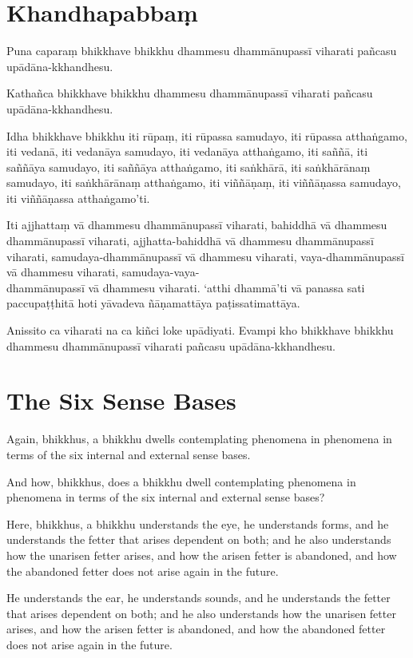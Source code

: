 \paliPage
\section*{Khandhapabbaṃ}

Puna caparaṃ bhikkhave bhikkhu dhammesu dhammānupassī viharati pañcasu
upādāna-kkhandhesu.

Kathañca bhikkhave bhikkhu dhammesu dhammānupassī viharati pañcasu
upādāna-kkhandhesu.

Idha bhikkhave bhikkhu
iti rūpaṃ, iti rūpassa samudayo, iti rūpassa atthaṅgamo,
iti vedanā, iti vedanāya samudayo, iti vedanāya atthaṅgamo,
iti saññā, iti saññāya samudayo, iti saññāya atthaṅgamo,
iti saṅkhārā, iti saṅkhārānaṃ samudayo, iti saṅkhārānaṃ atthaṅgamo,
iti viññāṇaṃ, iti viññāṇassa samudayo, iti viññāṇassa atthaṅgamo'ti.

Iti ajjhattaṃ vā dhammesu dhammānupassī viharati,
bahiddhā vā dhammesu dhammānupassī viharati,
ajjhatta-bahiddhā vā dhammesu dhammānupassī viharati,
samudaya-dhammānupassī vā dhammesu viharati,
vaya-dhammānupassī vā dhammesu viharati,
samudaya-vaya-\\ dhammānupassī vā dhammesu viharati.
`atthi dhammā'ti vā panassa sati paccupaṭṭhitā hoti
yāvadeva ñāṇamattāya paṭissatimattāya.

Anissito ca viharati na ca kiñci loke upādiyati. Evampi kho bhikkhave bhikkhu
dhammesu dhammānupassī viharati pañcasu upādāna-kkhandhesu.


\englishPage
\section{The Six Sense Bases}

Again, bhikkhus, a bhikkhu dwells contemplating phenomena in phenomena in terms
of the six internal and external sense bases.

And how, bhikkhus, does a bhikkhu dwell contemplating phenomena in phenomena in
terms of the six internal and external sense bases?

Here, bhikkhus, a bhikkhu understands the eye, he understands forms, and he
understands the fetter that arises dependent on both; and he also understands
how the unarisen fetter arises, and how the arisen fetter is abandoned, and how
the abandoned fetter does not arise again in the future.

He understands the ear, he understands sounds, and he understands the fetter
that arises dependent on both; and he also understands how the unarisen fetter
arises, and how the arisen fetter is abandoned, and how the abandoned fetter
does not arise again in the future.

